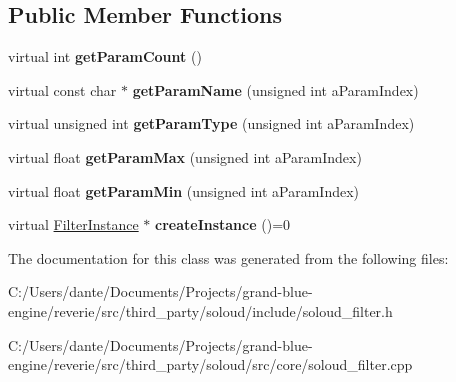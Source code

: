 \subsection*{Public Member Functions}
\begin{DoxyCompactItemize}
\item 
\mbox{\label{class_so_loud_1_1_filter_a0526cef5095f036805c47627145ceed8}} 
virtual int {\bfseries get\+Param\+Count} ()
\item 
\mbox{\label{class_so_loud_1_1_filter_a5165568f6f5a5695d1d1d22e78af4086}} 
virtual const char $\ast$ {\bfseries get\+Param\+Name} (unsigned int a\+Param\+Index)
\item 
\mbox{\label{class_so_loud_1_1_filter_ac6a4769f07629d0236f1756428caffc5}} 
virtual unsigned int {\bfseries get\+Param\+Type} (unsigned int a\+Param\+Index)
\item 
\mbox{\label{class_so_loud_1_1_filter_a010c56e24df200f6ad9043b3f1aeb757}} 
virtual float {\bfseries get\+Param\+Max} (unsigned int a\+Param\+Index)
\item 
\mbox{\label{class_so_loud_1_1_filter_a3cb3e3db8d95dd4474379022c4bf6b20}} 
virtual float {\bfseries get\+Param\+Min} (unsigned int a\+Param\+Index)
\item 
\mbox{\label{class_so_loud_1_1_filter_ad1a2997835abacc79f5780dd42830583}} 
virtual \mbox{\hyperlink{class_so_loud_1_1_filter_instance}{Filter\+Instance}} $\ast$ {\bfseries create\+Instance} ()=0
\end{DoxyCompactItemize}


The documentation for this class was generated from the following files\+:\begin{DoxyCompactItemize}
\item 
C\+:/\+Users/dante/\+Documents/\+Projects/grand-\/blue-\/engine/reverie/src/third\+\_\+party/soloud/include/soloud\+\_\+filter.\+h\item 
C\+:/\+Users/dante/\+Documents/\+Projects/grand-\/blue-\/engine/reverie/src/third\+\_\+party/soloud/src/core/soloud\+\_\+filter.\+cpp\end{DoxyCompactItemize}
